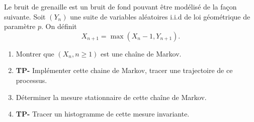 \documentclass[solutions]{exercices}
\begin{document}
\begin{exercice}
	Le bruit de grenaille est un bruit de fond pouvant être modélisé de la façon suivante. Soit $(Y_n)$ une suite de variables aléatoires i.i.d de loi géométrique de paramètre $p$. On définit
	\[ X_{n+1} = \max(X_n -1 ,Y_{n+1}).\]
	\begin{enumerate}
		\item Montrer que $(X_n, n \geq 1)$ est une chaîne de Markov.
		\item \textbf{TP-} Implémenter cette chaine de Markov, tracer une trajectoire de ce processus.
		\item Déterminer la mesure stationnaire de cette chaîne de Markov.
		\item \textbf{TP-} Tracer un histogramme de cette mesure invariante.
	\end{enumerate}
\end{exercice}
\end{document}

